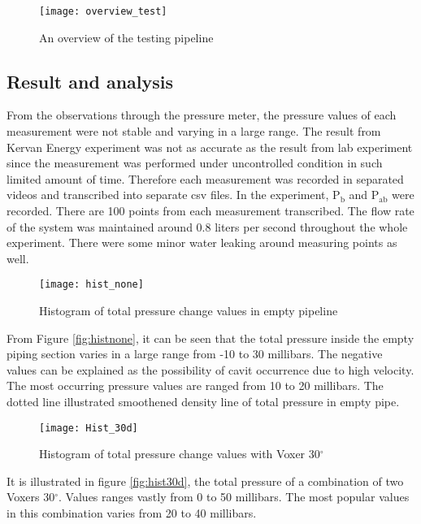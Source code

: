 \begin{figure}[b]
  \centering
  \texttt{[image: overview\_test]}
  \caption{ An overview of the testing pipeline}
  \label{fig:overview}
\end{figure}

\subsection{Result and analysis}

From the observations through the pressure meter, the pressure values of each measurement were not stable and varying in a large range. The result from Kervan Energy experiment was not as accurate as the result from lab experiment since the measurement was performed under uncontrolled condition in such limited amount of time. Therefore each measurement was recorded in separated videos and transcribed into separate \gls{csv} files. In the experiment, P$_{\text{b}}$ and P$_{\text{ab}}$ were recorded. There are 100 points from each measurement transcribed. The flow rate of the system was maintained around 0.8 liters per second throughout the whole experiment. There were some minor water leaking around measuring points as well.

\begin{figure}[h]
  \centering
  \texttt{[image: hist\_none]}
  \caption{ Histogram of total pressure change values in empty pipeline}
  \label{fig:histnone}
\end{figure}

From Figure \vref{fig:histnone}, it can be seen that the total pressure inside the empty piping section varies in a large range from -10 to 30 millibars. The negative values can be explained as the possibility of \gls{cavit} occurrence due to high velocity. The most occurring pressure values are ranged from 10 to 20 millibars. The dotted line illustrated smoothened density line of total pressure in empty pipe. 
\newpage

\begin{figure}[t]
  \centering
  \texttt{[image: Hist\_30d]}
  \caption{ Histogram of total pressure change values with Voxer 30$^{\circ}$}
  \label{fig:hist30d}
\end{figure}

It is illustrated in figure \vref{fig:hist30d}, the total pressure of a combination of two Voxers 30$^{\circ}$. Values ranges vastly from 0 to 50 millibars. The most popular values in this combination varies from 20 to 40 millibars.

